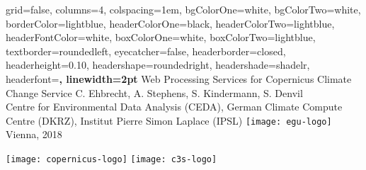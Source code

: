 \documentclass[landscape,a0paper,fontscale=0.4]{baposter} %
\begin{document}


\begin{poster}%
  {
  grid=false,
  columns=4,
  colspacing=1em,
  bgColorOne=white, %
  bgColorTwo=white, %
  borderColor=lightblue, %
  headerColorOne=black, %
  headerColorTwo=lightblue, %
  headerFontColor=white, %
  boxColorOne=white, %
  boxColorTwo=lightblue,
  textborder=roundedleft,
  eyecatcher=false, %
  headerborder=closed, %
  headerheight=0.10\textheight, %
  headershape=roundedright, %
  headershade=shadelr,
  headerfont=\Large\bf\textsf, %
  linewidth=2pt
  }
  {} %
  {\sf %
  Web Processing Services for Copernicus Climate Change Service
  }
  {\sf %
    C. Ehbrecht\footnotemark[2], A. Stephens\footnotemark[1], S. Kindermann\footnotemark[2], S. Denvil\footnotemark[3]\\
    {\smaller Centre for Environmental Data Analysis (CEDA)\footnotemark[1],
    German Climate Compute Centre (DKRZ)\footnotemark[2],
    Institut Pierre Simon Laplace (IPSL)\footnotemark[3]}\hspace{7em}
    \texttt{[image: egu-logo]} Vienna, 2018
  }
  {
    \begin{minipage}{30em}
      \hfill
      \texttt{[image: copernicus-logo]}
      \texttt{[image: c3s-logo]}
    \end{minipage}
  }


\end{poster}
\end{document}
